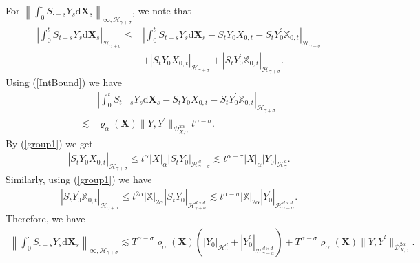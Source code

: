 \documentclass[10pt,a4paper]{article}
\numberwithin{equation}{section}
\begin{document}
For $ \left\|\int_0^\cdot S_{\cdot-s} Y_s \mathrm{d} \mathbf X_s \right\|_{\infty, \mathcal{H}_{\gamma+\sigma}}$, we note that
\begin{align*}
	\left| \int_0^t S_{t-s} Y_s \mathrm{d} \mathbf X_s \right|_{\mathcal{H}_{\gamma+\sigma}}
	\leq &	\left|\int_0^t S_{t-s} Y_s \mathrm{d} \mathbf X_s-S_t Y_0 X_{0,t}-S_t Y_0^\prime \mathbb{X}_{0,t} \right|_{\mathcal{H}_{\gamma+\sigma}} \nonumber\\
	&+|S_t Y_0 X_{0,t}|_{\mathcal{H}_{\gamma+\sigma}}+ |S_t Y_0^\prime \mathbb{X}_{0,t}|_{\mathcal{H}_{\gamma+\sigma}}.
\end{align*}
Using (\ref{IntBound}) we have
\begin{align*}
	&\left| \int_0^t S_{t-s} Y_s \mathrm{d} \mathbf X_s-S_t Y_0 X_{0,t}-S_t Y_0^\prime \mathbb{X}_{0,t} \right|_{\mathcal{H}_{\gamma+\sigma}} \\
	\lesssim & \varrho_{\alpha}(\mathbf{X}) \|Y,Y^\prime\|_{\mathcal{D}_{X,\gamma}^{2\alpha}}  t^{\alpha-\sigma}.
\end{align*}
By (\ref{group1}) we get
\begin{align*}
	|S_t Y_0 X_{0,t}|_{\mathcal{H}_{\gamma+\sigma}} \leq t^\alpha |X|_\alpha |S_t Y_0|_{\mathcal H_{\gamma+\sigma}^{d}}
	\lesssim t^{\alpha-\sigma} |X|_\alpha |Y_0|_{\mathcal H_{\gamma}^{d}}.
\end{align*}
Similarly, using (\ref{group1}) we have
\begin{align*}
	|S_t Y_0^\prime \mathbb{X}_{0,t}|_{\mathcal{H}_{\gamma+\sigma}} \leq  t^{2\alpha} |\mathbb{X}|_{2\alpha} |S_t Y_0^\prime|_{\mathcal H_{\gamma+\sigma}^{d \times d}}
	\lesssim  t^{\alpha-\sigma} |\mathbb{X}|_{2\alpha} |Y_0^\prime|_{\mathcal H_{\gamma-\alpha}^{d \times d}} .
\end{align*}
Therefore, we have
\begin{align}\label{IntGsup}
	\left\|\int_0^\cdot S_{\cdot-s} Y_s \mathrm{d} \mathbf X_s \right\|_{\infty, \mathcal{H}_{\gamma+\sigma}}
	\lesssim  T^{\alpha-\sigma}\varrho_{\alpha}(\mathbf{X}) \left(|Y_0|_{\mathcal H_\gamma^d}+|Y_0^\prime|_{\mathcal H_{\gamma-\alpha}^{d \times d}} \right)
	+T^{\alpha-\sigma} \varrho_{\alpha}(\mathbf{X}) \|Y,Y^\prime\|_{\mathcal{D}_{X,\gamma}^{2\alpha}}.	
\end{align}
\end{document}
